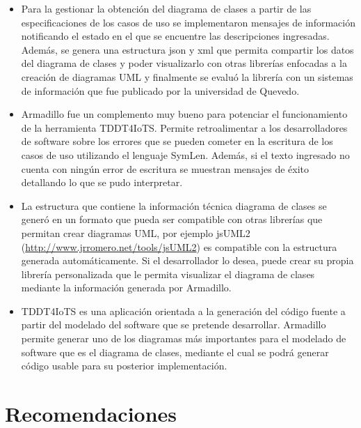 \begin{itemize}
	
	\item Para la gestionar la obtención del diagrama de clases a partir de las especificaciones de los casos de uso se implementaron mensajes de información notificando el estado en el que se encuentre las descripciones ingresadas. Además, se genera una estructura json y xml que permita compartir los datos del diagrama de clases y poder visualizarlo con otras librerías enfocadas a la creación de diagramas UML y finalmente se evaluó la librería con un sistemas de información que fue publicado por la universidad de Quevedo.
	
	\item Armadillo fue un complemento muy bueno para potenciar el funcionamiento de la herramienta TDDT4IoTS. Permite retroalimentar a los desarrolladores de software sobre los errores que se pueden cometer en la escritura de los casos de uso utilizando el lenguaje SymLen. Además, si el texto ingresado no cuenta con ningún error de escritura se muestran mensajes de éxito detallando lo que se pudo interpretar.
	\item La estructura que contiene la información técnica diagrama de clases se generó en un formato que pueda ser compatible con otras librerías que permitan crear diagramas UML, por ejemplo jsUML2  (\url{http://www.jrromero.net/tools/jsUML2}) es compatible con la estructura generada automáticamente. Si el desarrollador lo desea, puede crear su propia librería personalizada que le permita visualizar el diagrama de clases mediante la información generada por Armadillo. 
	\item TDDT4IoTS es una aplicación orientada a la generación del código fuente a partir del modelado del software que se pretende desarrollar. Armadillo permite generar uno de los diagramas más importantes para el modelado de software que es el diagrama de clases, mediante el cual se podrá generar código usable para su posterior implementación. 
\end{itemize}

\newpage
\section{Recomendaciones}
	
